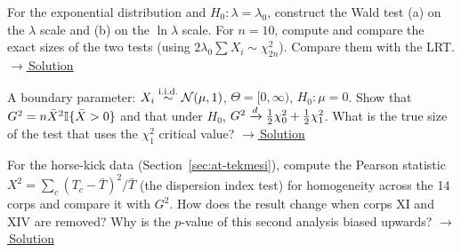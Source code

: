 \documentclass[main.tex]{subfiles}
\begin{document}
\begin{exercise}\label{exr:15-3}
For the exponential distribution and $H_0:\lambda=\lambda_0$, construct the Wald test (a) on the $\lambda$ scale and (b) on the $\ln\lambda$ scale. For $n=10$, compute and compare the exact sizes of the two tests (using $2\lambda_0\sum X_i\sim\chi^2_{2n}$). Compare them with the LRT.
\hfill\hyperref[coz:15-3]{\footnotesize$\rightarrow$\,Solution}
\end{exercise}

\begin{exercise}\label{exr:15-4}
A boundary parameter: $X_i\overset{\text{i.i.d.}}{\sim}\mathcal{N}(\mu,1)$, $\Theta=[0,\infty)$, $H_0:\mu=0$. Show that $G^2=n\bar X^2\mathbb{I}\{\bar X>0\}$ and that under $H_0$, $G^2\xrightarrow{d}\frac12\chi^2_0+\frac12\chi^2_1$. What is the true size of the test that uses the $\chi^2_1$ critical value?
\hfill\hyperref[coz:15-4]{\footnotesize$\rightarrow$\,Solution}
\end{exercise}

\begin{exercise}\label{exr:15-5}
For the horse-kick data (Section~\ref{sec:at-tekmesi}), compute the Pearson statistic $X^2=\sum_c(T_c-\bar T)^2/\bar T$ (the dispersion index test) for homogeneity across the 14 corps and compare it with $G^2$. How does the result change when corps XI and XIV are removed? Why is the $p$-value of this second analysis biased upwards?
\hfill\hyperref[coz:15-5]{\footnotesize$\rightarrow$\,Solution}
\end{exercise}

\end{document}
